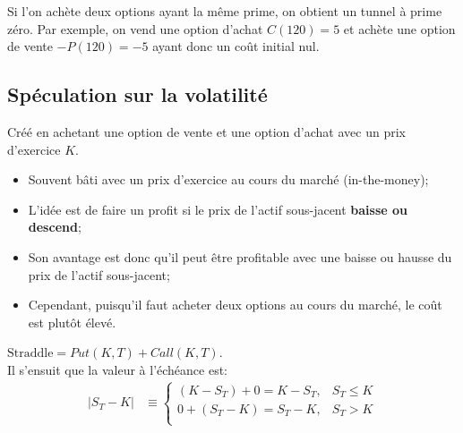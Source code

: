 \documentclass[10pt, french]{article}
\begin{document}
\begin{multicols*}{2}
\begin{definitionNOHFILL}
Si l'on achète deux options ayant la même prime, on obtient un tunnel à prime zéro. Par exemple, on vend une option d'achat $C(120) = 5$ et achète une option de vente $-P(120) = -5$ ayant donc un coût initial nul.
\end{definitionNOHFILL}

\columnbreak
\subsection*{Spéculation sur la volatilité}
\begin{definitionNOHFILL}
Créé en achetant une option de vente et une option d'achat avec un prix d'exercice $K$.

\begin{distributions}[Contexte]
\begin{itemize}[leftmargin = *]
	\item	Souvent bâti avec un prix d'exercice au cours du marché (in-the-money);
	\item	L'idée est de faire un profit si le prix de l'actif sous-jacent \textbf{baisse ou descend};
	\item	Son avantage est donc qu'il peut être profitable avec une baisse ou hausse du prix de l'actif sous-jacent;
	\item	Cependant, puisqu'il faut acheter deux options au cours du marché, le coût est plutôt élevé.
\end{itemize}
\end{distributions}

$\text{Straddle} = Put(K, T) + Call(K, T)$.\\

Il s'ensuit que la valeur à l'échéance est:
\begin{align*}
	|S_{T} - K|	
	&\equiv	
		\begin{cases}
		(K - S_{T})	+	0	=	K - S_{T},	&	S_{T} \le K	\\
		0	+	(S_{T} - K)	=	S_{T} - K,	&	S_{T} >	K	\\
		\end{cases}
\end{align*}

\begin{center}
\begin{tikzpicture}[x=0.75pt,y=0.75pt,yscale=-1,xscale=1]


\end{tikzpicture}
\end{center}
\end{definitionNOHFILL}
\end{multicols*}
\end{document}
